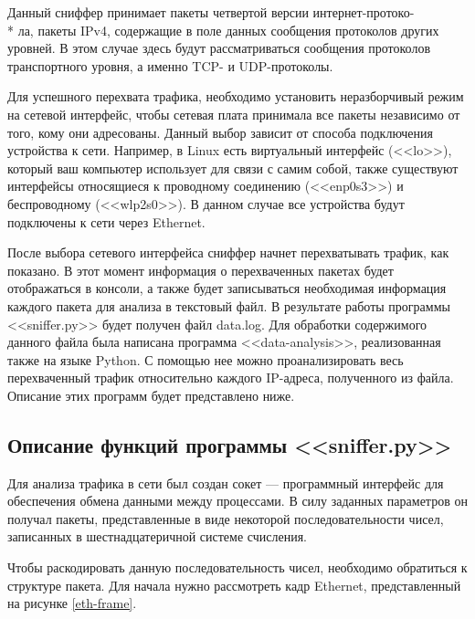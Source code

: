 \documentclass[bachelor, och, coursework]{SCWorks}
\begin{document}
  Данный сниффер принимает пакеты четвертой версии интернет-протоко- \\* ла, пакеты IPv4, содержащие в поле данных сообщения протоколов
  других уровней. В этом случае здесь будут рассматриваться сообщения протоколов транспортного уровня, а именно TCP- и UDP-протоколы.
    
  Для успешного перехвата трафика, необходимо установить неразборчивый режим на сетевой интерфейс, чтобы сетевая плата принимала
  все пакеты независимо от того, кому они адресованы. Данный выбор зависит от способа подключения устройства к сети. Например, в Linux
  есть виртуальный интерфейс (<<lo>>), который ваш компьютер использует для связи с самим собой, также существуют интерфейсы относящиеся
  к проводному соединению (<<enp0s3>>) и беспроводному (<<wlp2s0>>). В данном случае все устройства будут подключены к сети через Ethernet.
  
  После выбора сетевого интерфейса сниффер начнет перехватывать трафик, как показано. В этот момент информация о перехваченных пакетах будет отображаться
  в консоли, а также будет записываться необходимая информация каждого пакета для анализа в текстовый файл.
  В результате работы программы <<sniffer.py>> будет получен файл data.log. Для обработки содержимого данного файла была написана программа
  <<data-analysis>>, реализованная также на языке Python. С помощью нее можно проанализировать весь перехваченный трафик относительно каждого
  IP-адреса, полученного из файла. Описание этих программ будет представлено ниже. 

  \subsection{Описание функций программы <<sniffer.py>>}

    Для анализа трафика в сети был создан сокет --- программный интерфейс для обеспечения обмена данными между процессами. В силу заданных параметров он
    получал пакеты, представленные в виде некоторой последовательности чисел, записанных в шестнадцатеричной системе счисления.
    
    
    Чтобы раскодировать данную последовательность чисел, необходимо обратиться к структуре пакета. Для начала нужно рассмотреть кадр Ethernet, представленный
    на рисунке \ref{eth-frame}.
    
\end{document}

